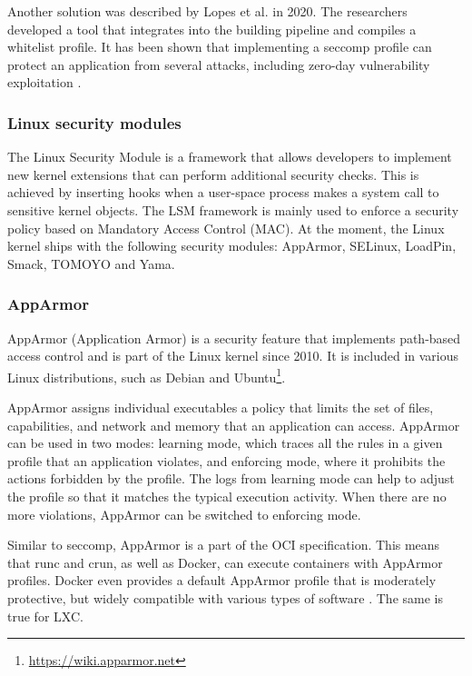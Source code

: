 Another solution was described by Lopes et al. in 2020. The researchers developed a tool that integrates into the building pipeline and compiles a whitelist profile. It has been shown that implementing a seccomp profile can protect an application from several attacks, including zero-day vulnerability exploitation \cite{acm:7}. 

\subsubsection*{Linux security modules}

The Linux Security Module is a framework that allows developers to implement new kernel extensions that can perform additional security checks. This is achieved by inserting hooks when a user-space process makes a system call to sensitive kernel objects. The LSM framework is mainly used to enforce a security policy based on Mandatory Access Control (MAC). At the moment, the Linux kernel ships with the following security modules: AppArmor, SELinux, LoadPin, Smack, TOMOYO and Yama.

\subsubsection*{AppArmor}

AppArmor (Application Armor) is a security feature that implements path-based access control and is part of the Linux kernel since 2010. It is included in various Linux distributions, such as Debian and Ubuntu\footnote{\url{https://wiki.apparmor.net}}.

AppArmor assigns individual executables a policy that limits the set of files, capabilities, and network and memory that an application can access. AppArmor can be used in two modes: learning mode, which traces all the rules in a given profile that an application violates, and enforcing mode, where it prohibits the actions forbidden by the profile. The logs from learning mode can help to adjust the profile so that it matches the typical execution activity. When there are no more violations, AppArmor can be switched to enforcing mode.

Similar to seccomp, AppArmor is a part of the OCI specification. This means that runc and crun, as well as Docker, can execute containers with AppArmor profiles. Docker even provides a default AppArmor profile that is moderately protective, but widely compatible with various types of software \cite{d:dockerapparmor}. The same is true for LXC.

